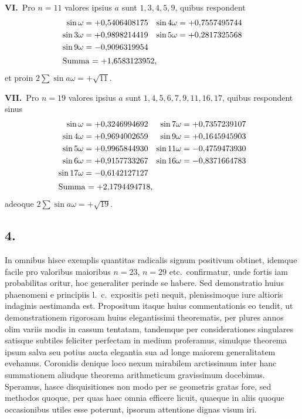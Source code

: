\documentclass[12pt,a4paper]{article}
\theoremstyle{plain}
\begin{document}
\medskip
\noindent\textbf{VI.}\ Pro $n = 11$ valores ipsius $a$ sunt $1, 3, 4, 5, 9$, quibus respondent
\begin{align*}
\sin \omega &= +0{,}5406408175 & \sin 4\omega &= +0{,}7557495744\\
\sin 3\omega &= +0{,}9898214419 & \sin 5\omega &= +0{,}2817325568\\
\sin 9\omega &= -0{,}9096319954\\
\intertext{Summa $= +1{,}6583123952$,}
\end{align*}
et proin $2\sum \sin a\omega = +\sqrt{11}$.

\medskip
\noindent\textbf{VII.}\ Pro $n = 19$ valores ipsius $a$ sunt $1, 4, 5, 6, 7, 9, 11, 16, 17$, quibus respondent sinus
\begin{align*}
\sin \omega &= +0{,}3246994692 & \sin 7\omega &= +0{,}7357239107\\
\sin 4\omega &= +0{,}9694002659 & \sin 9\omega &= +0{,}1645945903\\
\sin 5\omega &= +0{,}9965844930 & \sin 11\omega &= -0{,}4759473930\\
\sin 6\omega &= +0{,}9157733267 & \sin 16\omega &= -0{,}8371664783\\
\sin 17\omega &= -0{,}6142127127\\
\intertext{Summa $= +2{,}1794494718$,}
\end{align*}
adeoque $2\sum \sin a\omega = +\sqrt{19}$.

\subsection*{4.}

In omnibus hisce exemplis quantitas radicalis signum positivum obtinet, idemque facile pro valoribus maioribus $n = 23$, $n = 29$ etc.\ confirmatur, unde fortis iam probabilitas oritur, hoc generaliter perinde se habere. Sed demonstratio huius phaenomeni e principiis l.\ c.\ expositis peti nequit, plenissimoque iure altioris indaginis aestimanda est. Propositum itaque huius commentationis eo tendit, ut demonstrationem rigorosam huius elegantissimi theorematis, per plures annos olim variis modis in cassum tentatam, tandemque per considerationes singulares satisque subtiles feliciter perfectam in medium proferamus, simulque theorema ipsum salva seu potius aucta elegantia sua ad longe maiorem generalitatem evehamus. Coronidis denique loco nexum mirabilem arctissimum inter hanc summationem aliudque theorema arithmeticum gravissimum docebimus. Speramus, hasce disquisitiones non modo per se geometris gratas fore, sed methodos quoque, per quas haec omnia efficere licuit, quaeque in aliis quoque occasionibus utiles esse poterunt, ipsorum attentione dignas visum iri.
\end{document}
